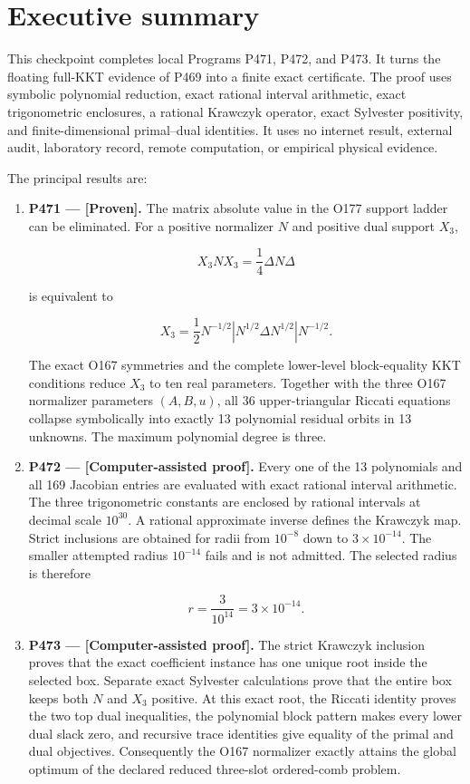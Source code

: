 \documentclass[11pt,a4paper,openany]{report}
\newcommand{\statusProven}{\textcolor{fingreen}{[Proven]}}
\begin{document}
\chapter{Executive summary}

This checkpoint completes local Programs P471, P472, and P473. It turns the floating full-KKT evidence of P469 into a finite exact certificate. The proof uses symbolic polynomial reduction, exact rational interval arithmetic, exact trigonometric enclosures, a rational Krawczyk operator, exact Sylvester positivity, and finite-dimensional primal--dual identities. It uses no internet result, external audit, laboratory record, remote computation, or empirical physical evidence.

The principal results are:

\begin{enumerate}
\item 
\textbf{P471 --- \statusProven{}.} The matrix absolute value in the O177 support ladder can be eliminated. For a positive normalizer \(N\) and positive dual support \(X_3\),

\[
   X_3 N X_3=\frac14\Delta N\Delta
   \]

is equivalent to

\[
   X_3=\frac12N^{-1/2}
   \left|N^{1/2}\Delta N^{1/2}\right|N^{-1/2}.
   \]

The exact O167 symmetries and the complete lower-level block-equality KKT conditions reduce \(X_3\) to ten real parameters. Together with the three O167 normalizer parameters \((A,B,u)\), all 36 upper-triangular Riccati equations collapse symbolically into exactly 13 polynomial residual orbits in 13 unknowns. The maximum polynomial degree is three.

\item 
\textbf{P472 --- \textcolor{fingreen}{[Computer-assisted proof]}.} Every one of the 13 polynomials and all 169 Jacobian entries are evaluated with exact rational interval arithmetic. The three trigonometric constants are enclosed by rational intervals at decimal scale \(10^{30}\). A rational approximate inverse defines the Krawczyk map. Strict inclusions are obtained for radii from \(10^{-8}\) down to \(3\times10^{-14}\). The smaller attempted radius \(10^{-14}\) fails and is not admitted. The selected radius is therefore

\[
   r=\frac{3}{10^{14}}=3\times10^{-14}.
   \]

\item 
\textbf{P473 --- \textcolor{fingreen}{[Computer-assisted proof]}.} The strict Krawczyk inclusion proves that the exact coefficient instance has one unique root inside the selected box. Separate exact Sylvester calculations prove that the entire box keeps both \(N\) and \(X_3\) positive. At this exact root, the Riccati identity proves the two top dual inequalities, the polynomial block pattern makes every lower dual slack zero, and recursive trace identities give equality of the primal and dual objectives. Consequently the O167 normalizer exactly attains the global optimum of the declared reduced three-slot ordered-comb problem.

\end{enumerate}
\end{document}
